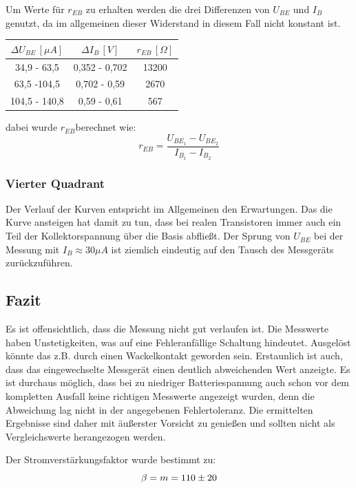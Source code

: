 Um Werte für \(r_{EB}\) zu erhalten werden die drei Differenzen von \(U_{BE}\) und \(I_{B}\) genutzt, da im allgemeinen dieser Widerstand in diesem Fall nicht konstant ist.
\begin{center}
\begin{tabular}{c|c|c}
\(\Delta U_{BE}\, [\mu A]\) & \(\Delta I_B\, [V]\) &  \(r_{EB}\, [\Omega]\) \\\hline
34,9 - 63,5 & 0,352 - 0,702 & 13200\\
63,5 -104,5 & 0,702 - 0,59 & 2670\\
104,5 - 140,8 & 0,59 - 0,61 & 567
\end{tabular}
\end{center}
dabei wurde \(r_{EB}\)berechnet wie:
\begin{equation}
r_{EB} = \frac{U_{BE_1}-U_{BE_2}}{I_{B_1}-I_{B_2}}
\end{equation}

\subsubsection{Vierter Quadrant}
Der Verlauf der Kurven entspricht im Allgemeinen den Erwartungen. Das die Kurve ansteigen hat damit zu tun, dass bei realen Transistoren immer auch ein Teil der Kollektorspannung über die Basis abfließt. Der Sprung von \(U_{BE}\) bei der Messung mit \(I_B \approx 30 \mu A\) ist ziemlich eindeutig auf den Tausch des Messgeräts zurückzuführen.

\subsection{Fazit}
Es ist offensichtlich, dass die Messung nicht gut verlaufen ist. Die Messwerte haben Unstetigkeiten, was auf eine Fehleranfällige Schaltung hindeutet. Ausgelöst könnte das z.B. durch einen Wackelkontakt geworden sein. Erstaunlich ist auch, dass das eingewechselte Messgerät einen deutlich abweichenden Wert anzeigte. Es ist durchaus möglich, dass bei zu niedriger Batteriespannung auch schon vor dem kompletten Ausfall keine richtigen Messwerte angezeigt wurden, denn die Abweichung lag nicht in der angegebenen Fehlertoleranz. Die ermittelten Ergebnisse sind daher mit äußerster Vorsicht zu genießen und sollten nicht als Vergleichswerte herangezogen werden. 

Der Stromverstärkungsfaktor wurde bestimmt zu:
\begin{equation}
\beta = m = 110 \pm 20 \notag
\end{equation}

